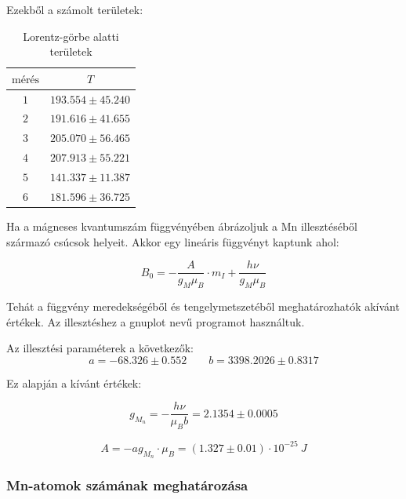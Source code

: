 \documentclass[12pt,a4paper]{article}
\theoremstyle{plain}
\begin{document}
\par Ezekből a számolt területek:
\begin{table}[H]
    \begin{center}
        \begin{tabular}{|c|c|}
            \hline
            $\textrm{mérés}$ & $T$                            \\ \hline
            $1$ & $193.554 \pm 45.240$ \\ \hline
            $2$ & $191.616 \pm 41.655$ \\ \hline
            $3$ & $205.070 \pm 56.465$ \\ \hline
            $4$ & $207.913 \pm 55.221$ \\ \hline
            $5$ & $141.337 \pm 11.387$ \\ \hline
            $6$ & $181.596 \pm 36.725$ \\ \hline
        \end{tabular}
        \caption{Lorentz-görbe alatti területek}
        \label{tab:2}
    \end{center}
\end{table}

Ha a mágneses kvantumszám függvényében ábrázoljuk a \textrm{Mn} illesztéséből származó csúcsok helyeit. Akkor egy lineáris függvényt kaptunk ahol:

\begin{equation}
    B_0 = - \dfrac{A}{g_M \mu_B} \cdot m_I + \dfrac{h \nu}{g_M \mu_B}
\end{equation}

Tehát a függvény meredekségéből és tengelymetszetéből meghatározhatók akívánt értékek.
Az illesztéshez a gnuplot nevű programot használtuk.

Az illesztési paraméterek a következők:
\begin{equation}
    a  = -68.326 \pm 0.552 \quad \quad b = 3398.2026 \pm 0.8317
\end{equation}

Ez alapján a kívánt értékek:

\begin{equation}
    g_{M_n}= -\dfrac{h \nu}{\mu_{B} b}= 2.1354 \pm 0.0005
\end{equation}

\begin{equation}
    A=-ag_{M_n} \cdot \mu_{B} = (1.327 \pm 0.01) \cdot 10^{-25} ~J
\end{equation}

\subsubsection{\textrm{Mn}-atomok számának meghatározása}
\end{document}
